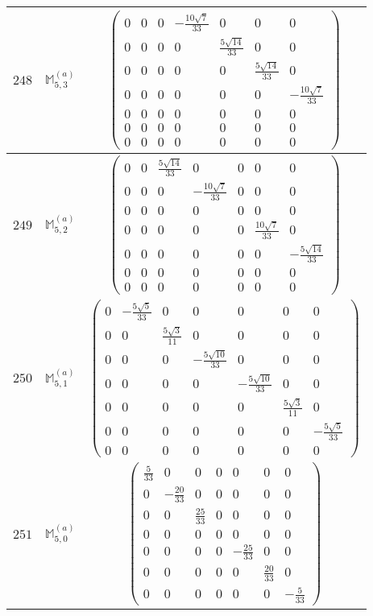 \documentclass[fleqn,8pt,landscape]{jsarticle}
\begin{document}
\begin{center}
\begin{longtable}{ccc}
$ 248 $ & $ \mathbb{M}_{5,3}^{(a)} $ & $ \begin{pmatrix} 0 & 0 & 0 & - \frac{10 \sqrt{7}}{33} & 0 & 0 & 0 \\ 0 & 0 & 0 & 0 & \frac{5 \sqrt{14}}{33} & 0 & 0 \\ 0 & 0 & 0 & 0 & 0 & \frac{5 \sqrt{14}}{33} & 0 \\ 0 & 0 & 0 & 0 & 0 & 0 & - \frac{10 \sqrt{7}}{33} \\ 0 & 0 & 0 & 0 & 0 & 0 & 0 \\ 0 & 0 & 0 & 0 & 0 & 0 & 0 \\ 0 & 0 & 0 & 0 & 0 & 0 & 0 \end{pmatrix} $ \\ \hline
$ 249 $ & $ \mathbb{M}_{5,2}^{(a)} $ & $ \begin{pmatrix} 0 & 0 & \frac{5 \sqrt{14}}{33} & 0 & 0 & 0 & 0 \\ 0 & 0 & 0 & - \frac{10 \sqrt{7}}{33} & 0 & 0 & 0 \\ 0 & 0 & 0 & 0 & 0 & 0 & 0 \\ 0 & 0 & 0 & 0 & 0 & \frac{10 \sqrt{7}}{33} & 0 \\ 0 & 0 & 0 & 0 & 0 & 0 & - \frac{5 \sqrt{14}}{33} \\ 0 & 0 & 0 & 0 & 0 & 0 & 0 \\ 0 & 0 & 0 & 0 & 0 & 0 & 0 \end{pmatrix} $ \\ \hline
$ 250 $ & $ \mathbb{M}_{5,1}^{(a)} $ & $ \begin{pmatrix} 0 & - \frac{5 \sqrt{5}}{33} & 0 & 0 & 0 & 0 & 0 \\ 0 & 0 & \frac{5 \sqrt{3}}{11} & 0 & 0 & 0 & 0 \\ 0 & 0 & 0 & - \frac{5 \sqrt{10}}{33} & 0 & 0 & 0 \\ 0 & 0 & 0 & 0 & - \frac{5 \sqrt{10}}{33} & 0 & 0 \\ 0 & 0 & 0 & 0 & 0 & \frac{5 \sqrt{3}}{11} & 0 \\ 0 & 0 & 0 & 0 & 0 & 0 & - \frac{5 \sqrt{5}}{33} \\ 0 & 0 & 0 & 0 & 0 & 0 & 0 \end{pmatrix} $ \\ \hline
$ 251 $ & $ \mathbb{M}_{5,0}^{(a)} $ & $ \begin{pmatrix} \frac{5}{33} & 0 & 0 & 0 & 0 & 0 & 0 \\ 0 & - \frac{20}{33} & 0 & 0 & 0 & 0 & 0 \\ 0 & 0 & \frac{25}{33} & 0 & 0 & 0 & 0 \\ 0 & 0 & 0 & 0 & 0 & 0 & 0 \\ 0 & 0 & 0 & 0 & - \frac{25}{33} & 0 & 0 \\ 0 & 0 & 0 & 0 & 0 & \frac{20}{33} & 0 \\ 0 & 0 & 0 & 0 & 0 & 0 & - \frac{5}{33} \end{pmatrix} $ \\ \hline

\end{longtable}
\end{center}
\end{document}

